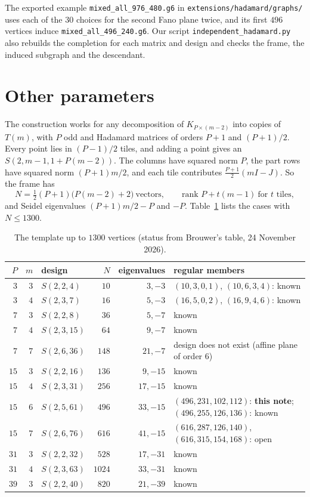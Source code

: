 \documentclass[11pt]{amsart}
\theoremstyle{remark}
\begin{document}
\begin{sloppypar}The exported example \texttt{mixed\_all\_976\_480.g6} in \texttt{extensions/hadamard/graphs/} uses each of the $30$ choices for the second Fano plane twice, and its first $496$ vertices induce \texttt{mixed\_all\_496\_240.g6}. Our script \texttt{independent\_hadamard.py} also rebuilds the completion for each matrix and design and checks the frame, the induced subgraph and the descendant.\end{sloppypar}

\section{Other parameters}\label{sec:other}

The construction works for any decomposition of $K_{P\times(m-2)}$ into copies of $T(m)$, with $P$ odd and Hadamard matrices of orders $P+1$ and $(P+1)/2$. Every point lies in $(P-1)/2$ tiles, and adding a point gives an $S(2,m-1,1+P(m-2))$. The columns have squared norm $P$, the part rows have squared norm $(P+1)m/2$, and each tile contributes $\tfrac{P+1}2(mI-J)$. So the frame has
\[
N=\tfrac12(P+1)\bigl(P(m-2)+2\bigr)\ \text{vectors},\qquad\text{rank } P+t(m-1)\ \text{for } t \text{ tiles},
\]
and Seidel eigenvalues $(P+1)m/2-P$ and $-P$. Table~\ref{tab:template} lists the cases with $N\le1300$.

\begin{table}[ht]
\centering\small
\caption{The template up to $1300$ vertices (status from Brouwer's table, 24 November 2026).}
\label{tab:template}
\begin{tabular}{@{}rrlrrl@{}}
\toprule
$P$ & $m$ & design & $N$ & eigenvalues & regular members \\
\midrule
$3$ & $3$ & $S(2,2,4)$ & $10$ & $3,-3$ & $(10,3,0,1)$, $(10,6,3,4)$: known\\
$3$ & $4$ & $S(2,3,7)$ & $16$ & $5,-3$ & $(16,5,0,2)$, $(16,9,4,6)$: known\\
$7$ & $3$ & $S(2,2,8)$ & $36$ & $5,-7$ & known\\
$7$ & $4$ & $S(2,3,15)$ & $64$ & $9,-7$ & known\\
$7$ & $7$ & $S(2,6,36)$ & $148$ & $21,-7$ & design does not exist (affine plane of order $6$)\\
$15$ & $3$ & $S(2,2,16)$ & $136$ & $9,-15$ & known\\
$15$ & $4$ & $S(2,3,31)$ & $256$ & $17,-15$ & known\\
$15$ & $6$ & $S(2,5,61)$ & $496$ & $33,-15$ & $(496,231,102,112)$: \textbf{this note}; $(496,255,126,136)$: known\\
$15$ & $7$ & $S(2,6,76)$ & $616$ & $41,-15$ & $(616,287,126,140)$, $(616,315,154,168)$: open\\
$31$ & $3$ & $S(2,2,32)$ & $528$ & $17,-31$ & known\\
$31$ & $4$ & $S(2,3,63)$ & $1024$ & $33,-31$ & known\\
$39$ & $3$ & $S(2,2,40)$ & $820$ & $21,-39$ & known\\
\bottomrule
\end{tabular}
\end{table}
\end{document}
